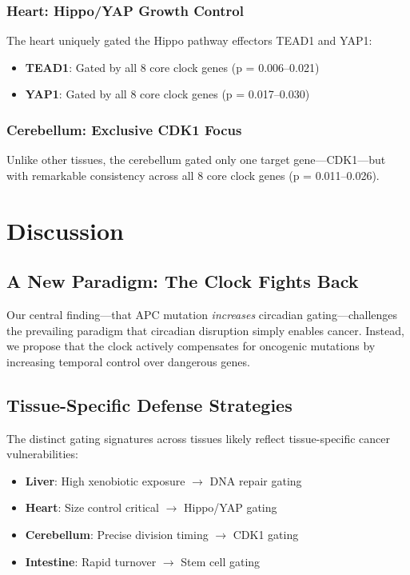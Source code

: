 \documentclass[11pt,letterpaper]{article}
\begin{document}
\subsubsection{Heart: Hippo/YAP Growth Control}

The heart uniquely gated the Hippo pathway effectors TEAD1 and YAP1:
\begin{itemize}
    \item \textbf{TEAD1}: Gated by all 8 core clock genes (p = 0.006--0.021)
    \item \textbf{YAP1}: Gated by all 8 core clock genes (p = 0.017--0.030)
\end{itemize}

\subsubsection{Cerebellum: Exclusive CDK1 Focus}

Unlike other tissues, the cerebellum gated only one target gene---CDK1---but with remarkable consistency across all 8 core clock genes (p = 0.011--0.026).

\section{Discussion}

\subsection{A New Paradigm: The Clock Fights Back}

Our central finding---that APC mutation \textit{increases} circadian gating---challenges the prevailing paradigm that circadian disruption simply enables cancer. Instead, we propose that the clock actively compensates for oncogenic mutations by increasing temporal control over dangerous genes.

\subsection{Tissue-Specific Defense Strategies}

The distinct gating signatures across tissues likely reflect tissue-specific cancer vulnerabilities:
\begin{itemize}
    \item \textbf{Liver}: High xenobiotic exposure $\rightarrow$ DNA repair gating
    \item \textbf{Heart}: Size control critical $\rightarrow$ Hippo/YAP gating
    \item \textbf{Cerebellum}: Precise division timing $\rightarrow$ CDK1 gating
    \item \textbf{Intestine}: Rapid turnover $\rightarrow$ Stem cell gating
\end{itemize}
\end{document}
